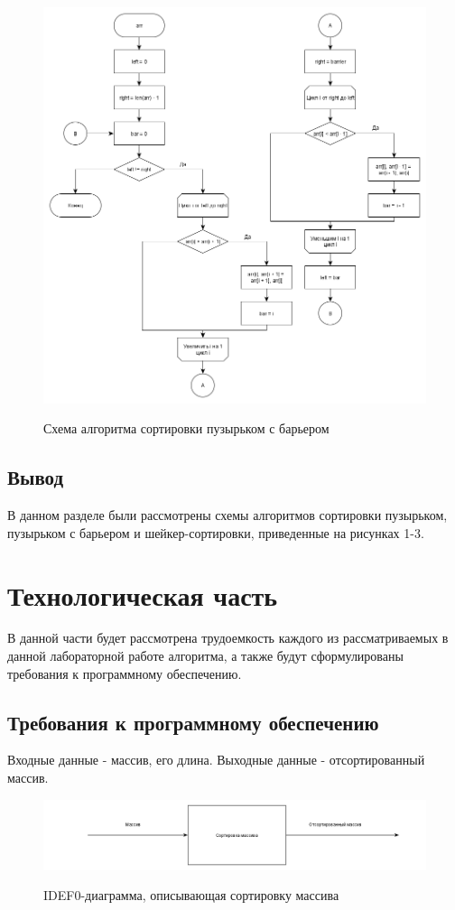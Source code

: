 \documentclass[a4paper, 14pt]{article}
\begin{document}
        	\begin{figure}[h]
        	\begin{center}
        		{\includegraphics[scale=0.41]{shaker_scheme}}
        		\caption{Схема алгоритма сортировки пузырьком с барьером}
        	\end{center}
        \end{figure}
		\subsection{Вывод}
		В данном разделе были рассмотрены схемы алгоритмов сортировки пузырьком, пузырьком с барьером и шейкер-сортировки, приведенные на рисунках 1-3.
		
		\newpage
		\section{Технологическая часть}
		В данной части будет рассмотрена трудоемкость каждого из рассматриваемых в данной лабораторной работе алгоритма, а также будут сформулированы требования к программному обеспечению.
		\subsection{Требования к программному обеспечению}
		Входные данные - массив, его длина.
		Выходные данные - отсортированный массив.
        	\begin{figure}[h]
        	\begin{center}
        		{\includegraphics[scale=0.48]{idef0_scheme}}
        		\caption{IDEF0-диаграмма, описывающая сортировку массива}
        	\end{center}
        \end{figure}
\end{document}
